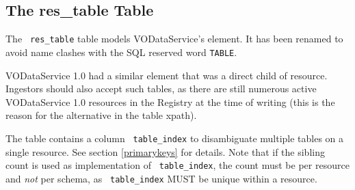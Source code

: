 \documentclass[11pt,a4paper]{ivoa}
\newcommand{\rtent}[1]{\texttt{\color{rtcolor} #1}}
\begin{document}
\subsection{The res\_table Table}

\label{table_res_table}

The \rtent{res\_table} table models VODataService's
 element.  It has been renamed to avoid name clashes
with the SQL reserved word \texttt{TABLE}.

VODataService 1.0 had a similar element that was a direct child of
resource.  Ingestors should also accept such tables, as there are still
numerous active VODataService 1.0 resources in the Registry at the time
of writing (this is the reason for the alternative in the table xpath).

The table contains a column \rtent{table\_index} to disambiguate
multiple tables on a single resource.  See section \ref{primarykeys} for details.  Note that if the sibling
count is used as implementation of \rtent{table\_index}, the count
must be per resource and \emph{not} per schema, as
\rtent{table\_index} MUST be unique within a resource.


\end{document}
